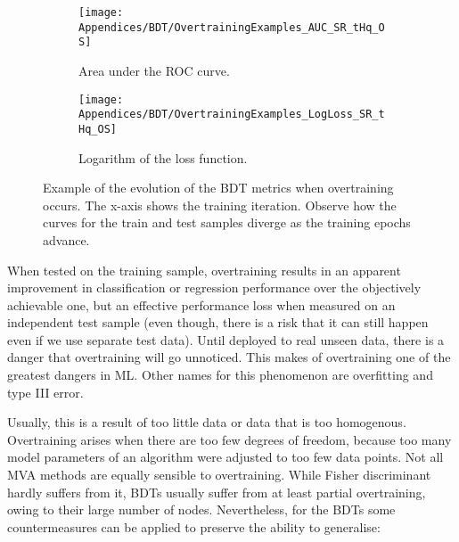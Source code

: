 \begin{figure}
\centering
\begin{subfigure}{.475\textwidth}
  \centering
  \texttt{[image: Appendices/BDT/OvertrainingExamples\_AUC\_SR\_tHq\_OS]}
  \caption{Area under the ROC curve.}
  \label{fig:Appendix:BDT:Overtrain:AUC}
\end{subfigure}%
\begin{subfigure}{.475\textwidth}
  \centering
  \texttt{[image: Appendices/BDT/OvertrainingExamples\_LogLoss\_SR\_tHq\_OS]}
  \caption{Logarithm of the loss function.}
  \label{fig:Appendix:BDT:Overtrain:LogLoss}
\end{subfigure}
\caption{Example of the evolution of the BDT metrics when overtraining occurs. The x-axis shows the training iteration. Observe how the curves for the train and test samples diverge as the training epochs advance.}
\label{fig:Appendix:BDT:Overtrain}
\end{figure}


When tested on the training sample, overtraining results in an apparent improvement 
in classification or regression performance over the objectively achievable one, but an 
effective performance loss when measured on an independent test sample (even though, 
there is a risk that it can still happen even if we use separate test data).
Until deployed to real unseen data, there is a danger that
overtraining will go unnoticed. This makes of overtraining one of the greatest dangers in ML.
Other names for this phenomenon are overfitting and type III error.

Usually, this is a result of too little data or data that is too homogenous.
Overtraining arises when there are too few degrees of freedom, because too many model parameters of an algorithm
were adjusted to too few data points.  Not all MVA methods are equally sensible to overtraining.  While Fisher 
discriminant hardly suffers from it, BDTs usually suffer from at least partial overtraining, owing to their large number of 
nodes. Nevertheless, for the BDTs some countermeasures can be applied to preserve the ability to generalise:

